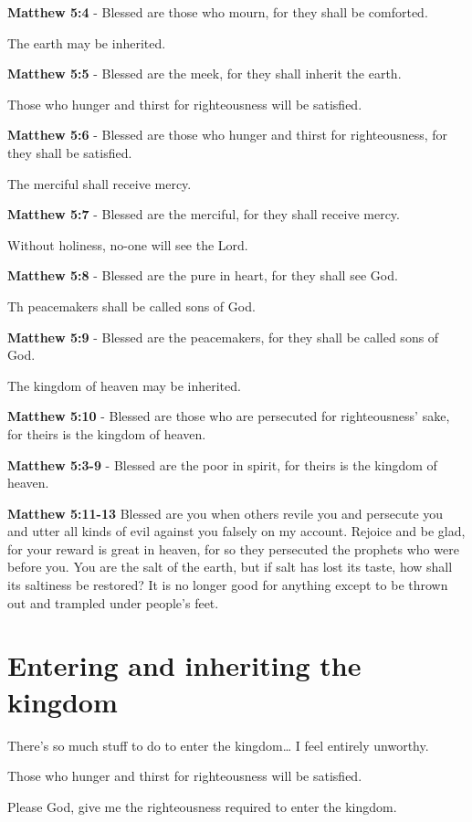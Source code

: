 \documentclass[11pt]{article}
\begin{document}
\textbf{Matthew 5:4} - Blessed are those who mourn, for they shall be comforted.

The earth may be inherited.

\textbf{Matthew 5:5} - Blessed are the meek, for they shall inherit the earth.

Those who hunger and thirst for righteousness will be satisfied.

\textbf{Matthew 5:6} - Blessed are those who hunger and thirst for righteousness, for they shall be satisfied.

The merciful shall receive mercy.

\textbf{Matthew 5:7} - Blessed are the merciful, for they shall receive mercy.

Without holiness, no-one will see the Lord.

\textbf{Matthew 5:8} - Blessed are the pure in heart, for they shall see God.

Th peacemakers shall be called sons of God.

\textbf{Matthew 5:9} - Blessed are the peacemakers, for they shall be called sons of God.

The kingdom of heaven may be inherited.

\textbf{Matthew 5:10} - Blessed are those who are persecuted for righteousness' sake, for theirs is the kingdom of heaven.

\textbf{Matthew 5:3-9} - Blessed are the poor in spirit, for theirs is the kingdom of heaven.

\textbf{Matthew 5:11-13}  Blessed are you when others revile you and persecute you and utter all kinds of evil against you falsely on my account. Rejoice and be glad, for your reward is great in heaven, for so they persecuted the prophets who were before you. You are the salt of the earth, but if salt has lost its taste, how shall its saltiness be restored? It is no longer good for anything except to be thrown out and trampled under people's feet.

\section{Entering and inheriting the kingdom}
\label{sec:org935bc78}
There's so much stuff to do to enter the kingdom\ldots{} I feel entirely unworthy.

Those who hunger and thirst for righteousness will be satisfied.

Please God, give me the righteousness required to enter the kingdom.
\end{document}
